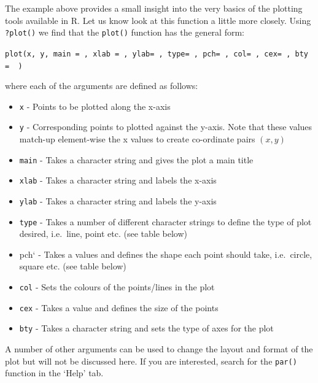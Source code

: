 \documentclass[
]{book}
\providecommand{\tightlist}{%
  \setlength{\itemsep}{0pt}\setlength{\parskip}{0pt}}
\theoremstyle{definition}
\theoremstyle{definition}
\theoremstyle{definition}
\theoremstyle{definition}
\theoremstyle{remark}
\begin{document}
The example above provides a small insight into the very basics of the plotting tools available in R. Let us know look at this function a little more closely. Using \texttt{?plot()} we find that the \texttt{plot()} function has the general form:

\texttt{plot(x,\ y,\ main\ =\ ,\ xlab\ =\ ,\ ylab=\ ,\ type=\ ,\ pch=\ ,\ col=\ ,\ cex=\ ,\ bty\ =\ \ )}

where each of the arguments are defined as follows:

\begin{itemize}
\tightlist
\item
  \texttt{x} - Points to be plotted along the x-axis
\item
  \texttt{y} - Corresponding points to plotted against the y-axis. Note that these values match-up element-wise the x values to create co-ordinate pairs \((x,y)\)
\item
  \texttt{main} - Takes a character string and gives the plot a main title
\item
  \texttt{xlab} - Takes a character string and labels the x-axis
\item
  \texttt{ylab} - Takes a character string and labels the y-axis
\item
  \texttt{type} - Takes a number of different character strings to define the type of plot desired, i.e.~line, point etc. (see table below)
\item
  pch` - Takes a values and defines the shape each point should take, i.e.~circle, square etc. (see table below)
\item
  \texttt{col} - Sets the colours of the points/lines in the plot
\item
  \texttt{cex} - Takes a value and defines the size of the points
\item
  \texttt{bty} - Takes a character string and sets the type of axes for the plot
\end{itemize}

A number of other arguments can be used to change the layout and format of the plot but will not be discussed here. If you are interested, search for the \texttt{par()} function in the `Help' tab.
\end{document}
